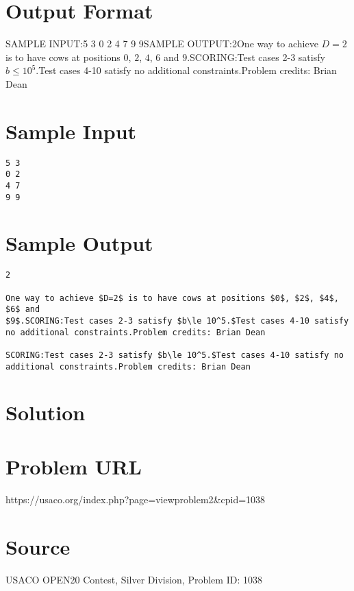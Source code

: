 \documentclass[12pt]{article}
\begin{document}
\section*{Output Format}
SAMPLE INPUT:5 3
0 2
4 7
9 9SAMPLE OUTPUT:2One way to achieve $D=2$ is to have cows at positions $0$, $2$, $4$, $6$ and
$9$.SCORING:Test cases 2-3 satisfy $b\le 10^5.$Test cases 4-10 satisfy no additional constraints.Problem credits: Brian Dean

\section*{Sample Input}
\begin{verbatim}
5 3
0 2
4 7
9 9
\end{verbatim}

\section*{Sample Output}
\begin{verbatim}
2

One way to achieve $D=2$ is to have cows at positions $0$, $2$, $4$, $6$ and
$9$.SCORING:Test cases 2-3 satisfy $b\le 10^5.$Test cases 4-10 satisfy no additional constraints.Problem credits: Brian Dean

SCORING:Test cases 2-3 satisfy $b\le 10^5.$Test cases 4-10 satisfy no additional constraints.Problem credits: Brian Dean
\end{verbatim}

\section*{Solution}


\section*{Problem URL}
https://usaco.org/index.php?page=viewproblem2&cpid=1038

\section*{Source}
USACO OPEN20 Contest, Silver Division, Problem ID: 1038
\end{document}
